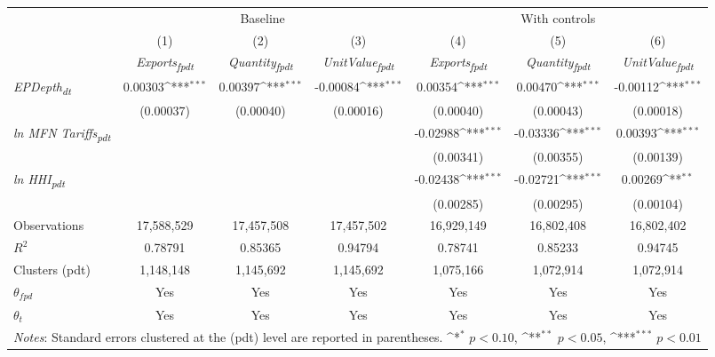 {
\def\sym#1{\ifmmode^{#1}\else\(^{#1}\)\fi}
\begin{tabular}{l*{6}{c}}
\toprule
&\multicolumn{3}{c}{Baseline}&\multicolumn{3}{c}{With controls}\\\cmidrule(lr){2-4}\cmidrule(lr){5-7}
&(1)&(2)&(3)&(4)&(5)&(6)\\
&\textit{Exports\textsubscript{fpdt}}&\textit{Quantity\textsubscript{fpdt}}&\textit{UnitValue\textsubscript{fpdt}}&\textit{Exports\textsubscript{fpdt}}&\textit{Quantity\textsubscript{fpdt}}&\textit{UnitValue\textsubscript{fpdt}}\\
\midrule
\textit{EPDepth\textsubscript{dt}} & 0.00303\sym{***} & 0.00397\sym{***} & -0.00084\sym{***} & 0.00354\sym{***} & 0.00470\sym{***} & -0.00112\sym{***}\\
 & (0.00037) & (0.00040) & (0.00016) & (0.00040) & (0.00043) & (0.00018)\\
\addlinespace
\textit{ln MFN Tariffs\textsubscript{pdt}} &  &  &  & -0.02988\sym{***} & -0.03336\sym{***} & 0.00393\sym{***}\\
 &  &  &  & (0.00341) & (0.00355) & (0.00139)\\
\addlinespace
\textit{ln HHI\textsubscript{pdt}} &  &  &  & -0.02438\sym{***} & -0.02721\sym{***} & 0.00269\sym{**}\\
 &  &  &  & (0.00285) & (0.00295) & (0.00104)\\
\midrule
Observations & 17,588,529 & 17,457,508 & 17,457,502 & 16,929,149 & 16,802,408 & 16,802,402\\
$R^{2}$ & 0.78791 & 0.85365 & 0.94794 & 0.78741 & 0.85233 & 0.94745\\
Clusters (pdt) & 1,148,148 & 1,145,692 & 1,145,692 & 1,075,166 & 1,072,914 & 1,072,914\\
$\theta_{fpd}$ & Yes & Yes & Yes & Yes & Yes & Yes\\
$\theta_{t}$ & Yes & Yes & Yes & Yes & Yes & Yes\\
\bottomrule
\multicolumn{7}{l}{\footnotesize \textit{Notes}: Standard errors clustered at the (pdt) level are reported in parentheses. \sym{*} \(p<0.10\), \sym{**} \(p<0.05\), \sym{***} \(p<0.01\)}\\
\end{tabular}
}
